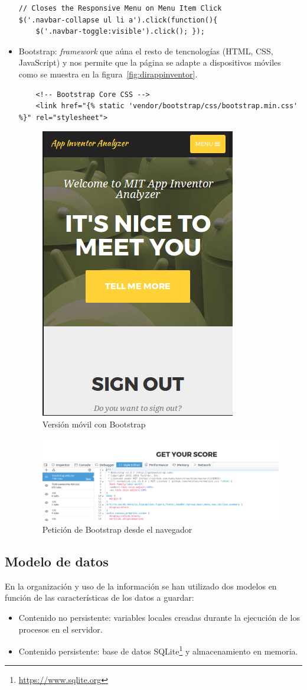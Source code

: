 \documentclass[a4paper, 12pt]{book}
\begin{document}
\begin{itemize}
\begin{lstlisting}
// Closes the Responsive Menu on Menu Item Click
$('.navbar-collapse ul li a').click(function(){ 
    $('.navbar-toggle:visible').click(); });
	\end{lstlisting}
	\item Bootstrap: \textit{framework} que aúna el resto de tencnologías (HTML, CSS, JavaScript) y nos permite que la página se adapte a dispositivos móviles como se muestra en la figura~\ref{fig:dirappinventor}.
		\begin{lstlisting}
    <!-- Bootstrap Core CSS -->
    <link href="{% static 'vendor/bootstrap/css/bootstrap.min.css' %}" rel="stylesheet">
		\end{lstlisting}
		\begin{figure}[H]
			  \centering
			  \includegraphics[width=0.30\linewidth, keepaspectratio]{img/mobileVersion}
			  \caption{Versión móvil con Bootstrap}
			  \label{fig:mobileVersion}
		\end{figure} 
		\begin{figure}[H]
			  \centering
			  \includegraphics[width=\linewidth, keepaspectratio]{img/bootstrapDebug}
			  \caption{Petición de Bootstrap desde el navegador}
			  \label{fig:mobileVersion}
		\end{figure} 

\end{itemize}                                   

\subsection{Modelo de datos}
En la organización y uso de la información se han utilizado dos modelos en función de las características de los datos a guardar: 
\begin{itemize}
	\item Contenido no persistente: variables locales creadas durante la ejecución de los procesos en el servidor. 
	\item Contenido persistente: base de datos SQLite\footnote{\url{https://www.sqlite.org}} y almacenamiento en memoria.
\end{itemize}                                   
\end{document}
